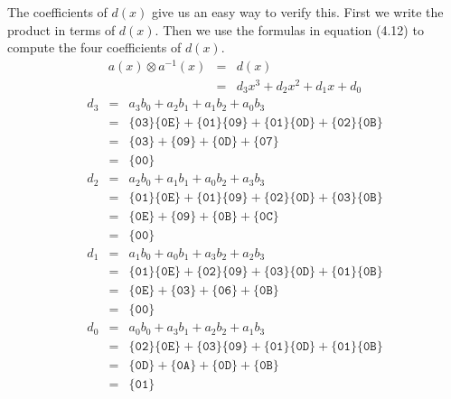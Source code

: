 \documentclass{article}
\begin{document}
\newpage
The coefficients of $d(x)$ give us an easy way to verify this.
First we write the product in terms of $d(x)$.
Then we use the formulas in equation (4.12) to compute 
the four coefficients of $d(x)$.
\begin{eqnarray*}
  a(x) \otimes a^{-1}(x) &=& d(x) \\
  &=& d_3 x^3 + d_2 x^2 + d_1 x + d_0
\end{eqnarray*}
\begin{eqnarray*}
  d_3 &=& a_3 b_0 + a_2 b_1 + a_1 b_2 + a_0 b_3 \\
      &=& \{\mathtt{03}\} \{\mathtt{0E}\} + 
          \{\mathtt{01}\} \{\mathtt{09}\} + 
	  \{\mathtt{01}\} \{\mathtt{0D}\} + 
	  \{\mathtt{02}\} \{\mathtt{0B}\} \\
      &=& \{\mathtt{03}\} + \{\mathtt{09}\} + \{\mathtt{0D}\} + \{\mathtt{07}\} \\
      &=& \{\mathtt{00}\}
\end{eqnarray*}
\begin{eqnarray*}
  d_2 &=& a_2 b_0 + a_1 b_1 + a_0 b_2 + a_3 b_3 \\
      &=& \{\mathtt{01}\} \{\mathtt{0E}\} + 
          \{\mathtt{01}\} \{\mathtt{09}\} + 
	  \{\mathtt{02}\} \{\mathtt{0D}\} + 
	  \{\mathtt{03}\} \{\mathtt{0B}\} \\
      &=& \{\mathtt{0E}\} + \{\mathtt{09}\} + \{\mathtt{0B}\} + \{\mathtt{0C}\} \\
      &=& \{\mathtt{00}\}
\end{eqnarray*}
\begin{eqnarray*}
  d_1 &=& a_1 b_0 + a_0 b_1 + a_3 b_2 + a_2 b_3 \\
      &=& \{\mathtt{01}\} \{\mathtt{0E}\} + 
          \{\mathtt{02}\} \{\mathtt{09}\} + 
	  \{\mathtt{03}\} \{\mathtt{0D}\} + 
	  \{\mathtt{01}\} \{\mathtt{0B}\} \\
      &=& \{\mathtt{0E}\} + \{\mathtt{03}\} + \{\mathtt{06}\} + \{\mathtt{0B}\} \\
      &=& \{\mathtt{00}\}
\end{eqnarray*}
\begin{eqnarray*}
  d_0 &=& a_0 b_0 + a_3 b_1 + a_2 b_2 + a_1 b_3 \\
      &=& \{\mathtt{02}\} \{\mathtt{0E}\} + 
          \{\mathtt{03}\} \{\mathtt{09}\} + 
	  \{\mathtt{01}\} \{\mathtt{0D}\} + 
	  \{\mathtt{01}\} \{\mathtt{0B}\} \\
      &=& \{\mathtt{0D}\} + \{\mathtt{0A}\} + \{\mathtt{0D}\} + \{\mathtt{0B}\} \\
      &=& \{\mathtt{01}\}
\end{eqnarray*}
\end{document}
